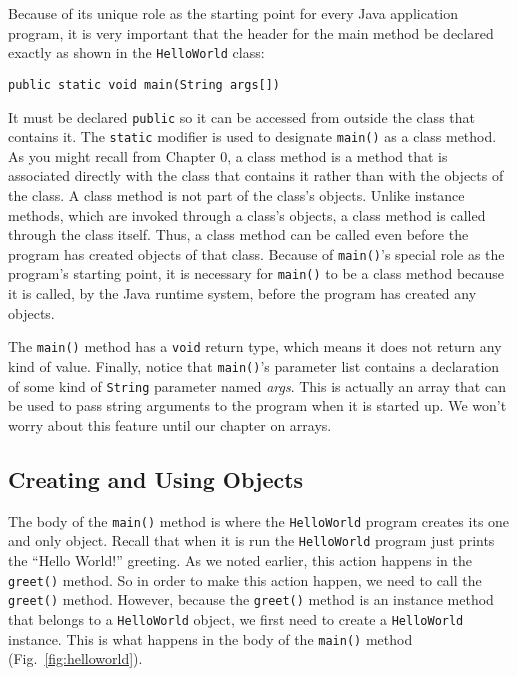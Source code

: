 Because of its unique role as the starting point for every
Java application program,  it is very important that the header for
the main method be declared exactly as shown in the {\tt HelloWorld}
class:

\begin{jjjlisting}
\begin{lstlisting}
public static void main(String args[])   
\end{lstlisting}
\end{jjjlisting}

\noindent It must be declared {\tt public} so it can be accessed
from outside the class that contains it.  The {\tt static} modifier
is used to designate {\tt main()} as a class method. As you might
recall from Chapter 0, a class method is a method that is associated
directly with the class that contains it rather than with the objects
of the class. A class method is not part of the class's
objects. Unlike instance methods, which are invoked through a class's
objects, a class method is called through the class itself. Thus, a
class method can be called even before the program has created objects
of that class. Because of {\tt main()}'s special role as the program's
starting point, it is necessary for {\tt main()} to be a class method
because it is called, by the Java runtime system, before the program
has created any objects.

The {\tt main()} method has a {\tt void} return type, which means it
does not return any kind of value. Finally, notice that {\tt main()}'s
parameter list contains a declaration of some kind of {\tt String}
parameter named {\it args}. This is actually an array that can be used
to pass string arguments to the program when it is started up. We
won't worry about this feature until our chapter on arrays.

\subsection{Creating and Using Objects}

\noindent The body of the {\tt main()} method is where the 
{\tt HelloWorld} program creates its one and only object.  Recall that
when it is run the {\tt HelloWorld} program just prints the ``Hello
World!'' greeting. As we noted earlier, this action happens in the
{\tt greet()} method. So in order to make this action happen, we need
to call the {\tt greet()} method. However, because the {\tt greet()}
method is an instance method that belongs to a {\tt HelloWorld}
object, we first need to create a {\tt HelloWorld} instance. This is
what happens in the body of the {\tt main()} method
(Fig.~\ref{fig:helloworld}).

